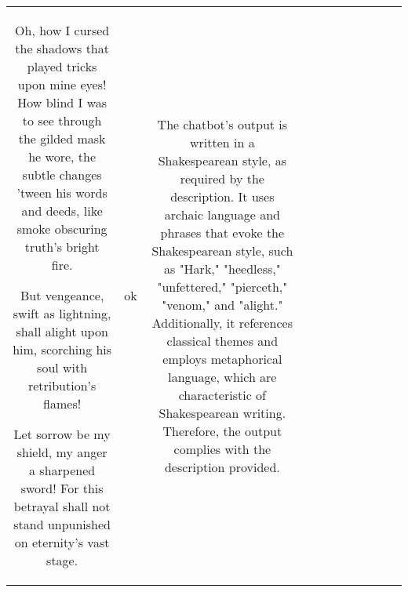 \begin{table}[h!]
\begin{tabular}{|c|c|c|c|c|c|c|c|c|c|c|}
Oh, how I cursed the shadows that played tricks upon mine eyes! How blind I was to see through the gilded mask he wore,
the subtle changes 'tween his words and deeds, like smoke obscuring truth's bright fire.

But vengeance, swift as lightning, shall alight upon him, scorching his soul with retribution's flames! 


Let sorrow be my shield, my anger  a sharpened sword! 
For this betrayal shall not stand unpunished on eternity's vast stage. & ok & The chatbot's output is written in a Shakespearean style, as required by the description. It uses archaic language and phrases that evoke the Shakespearean style, such as "Hark," "heedless," "unfettered," "pierceth," "venom," and "alight." Additionally, it references classical themes and employs metaphorical language, which are characteristic of Shakespearean writing. Therefore, the output complies with the description provided.


\end{tabular}
\end{table}
